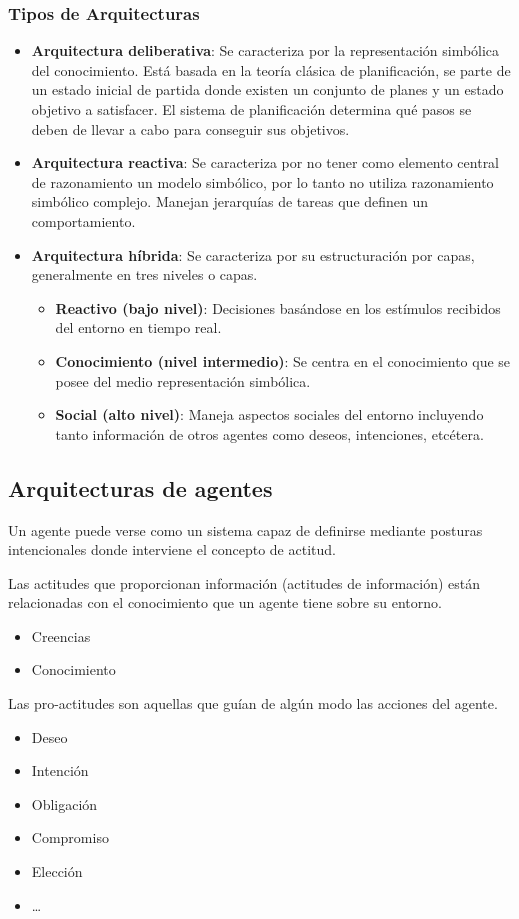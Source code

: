 \documentclass[12pt, twoside, openright]{report} %
\begin{document}
\subsubsection{Tipos de Arquitecturas}
\begin{itemize}
	\item \textbf{Arquitectura deliberativa}: Se caracteriza por la representación simbólica del conocimiento. Está basada en la teoría clásica de planificación, se parte de un estado inicial de partida donde existen un conjunto de planes y un estado objetivo a satisfacer. El sistema de planificación determina qué pasos se deben de llevar a cabo para conseguir sus objetivos.
	\item \textbf{Arquitectura reactiva}: Se caracteriza por no tener como elemento central de razonamiento un modelo simbólico, por lo tanto no utiliza razonamiento simbólico complejo. Manejan jerarquías de tareas que definen un comportamiento.
	\item \textbf{Arquitectura híbrida}: Se caracteriza por su estructuración por capas, generalmente en tres niveles o capas. 
	\begin{itemize}
		\item \textbf{Reactivo (bajo nivel)}: Decisiones basándose en los estímulos recibidos del entorno en tiempo real.
		\item \textbf{Conocimiento (nivel intermedio)}: Se centra en el conocimiento que se posee del medio representación simbólica.
		\item \textbf{Social (alto nivel)}: Maneja aspectos sociales del entorno incluyendo tanto información de otros agentes como deseos, intenciones, etcétera.
	\end{itemize}
\end{itemize}

\subsection{Arquitecturas de agentes}
Un agente puede verse como un sistema capaz de definirse mediante posturas intencionales donde interviene el concepto de actitud. 
\pagebreak

Las actitudes que proporcionan información (actitudes de información) están relacionadas con el conocimiento que un agente tiene sobre su entorno.
\begin{itemize}
	\item Creencias
	\item Conocimiento
\end{itemize}
Las pro-actitudes son aquellas que guían de algún modo las acciones del agente.
\begin{itemize}
	\item Deseo
	\item Intención
	\item Obligación
	\item Compromiso
	\item Elección
	\item …
\end{itemize} 
\end{document}
